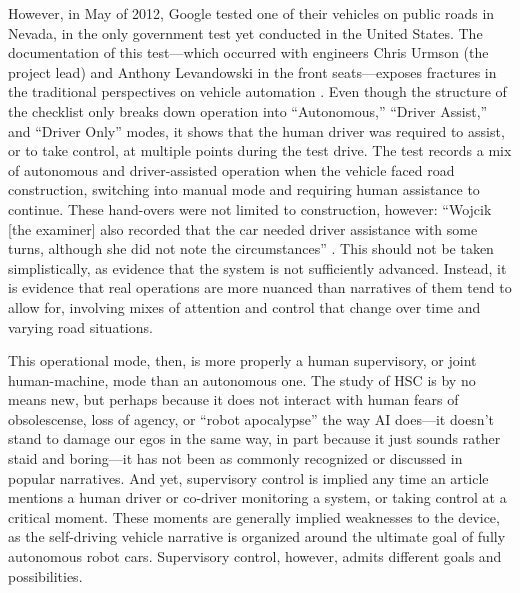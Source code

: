 
However, in May of 2012,
Google tested one of their vehicles on public
roads in Nevada, in the only government test yet conducted in the United States.
The documentation of this test---which occurred with engineers Chris
Urmson (the project lead) and Anthony Levandowski in the front
seats---exposes fractures in the traditional perspectives on vehicle
automation \cite{harrisNevada}. Even though the structure of the
checklist only breaks down operation into ``Autonomous,'' ``Driver
Assist,'' and ``Driver Only'' modes, it shows that the human driver
was required to assist, or to take control, at multiple points during
the test drive. The test records a mix of autonomous and
driver-assisted operation when the vehicle faced road construction,
switching into manual mode and requiring human assistance to continue.
These hand-overs were not limited to construction, however: 
``Wojcik [the examiner] also recorded that the car needed driver
assistance with some turns, although she did not note the
circumstances'' \cite{harrisNevada}. This should not be taken
simplistically, as evidence that the system is not sufficiently
advanced. Instead, it is evidence that real operations are more
nuanced than narratives of them tend to allow for, involving mixes of
attention and control that change over time and varying road situations.

This operational mode, then, is more properly a human supervisory, or
joint human-machine, mode
than an autonomous one. The study of HSC is by no means new, but
perhaps because it does not interact with human fears of obsolescense,
loss of agency, or ``robot apocalypse'' the way AI does---it doesn't stand
to damage our egos in the same way, in part because it just
sounds rather staid and boring---it has not been as commonly
recognized or discussed in popular narratives. And yet, supervisory
control is implied any time an article mentions a human driver or
co-driver monitoring a system, or taking control at a critical moment.
These moments are generally implied weaknesses to the device,
as the self-driving vehicle narrative is organized around the ultimate
goal of fully autonomous robot cars. Supervisory control, however,
admits different goals and possibilities.


